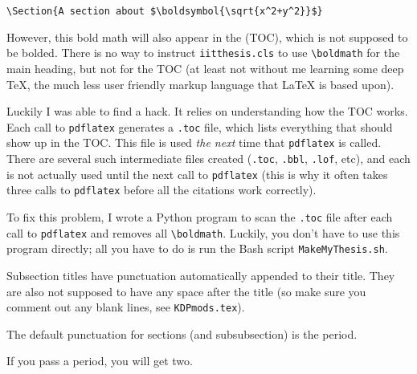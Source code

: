 \documentclass{iitthesis}
\begin{document}
	\verb|\Section{A section about $\boldsymbol{\sqrt{x^2+y^2}}$}|

\noindent 
However, this bold math will also appear in the (TOC), 
which is not supposed to be bolded.
There is no way to instruct {\tt iitthesis.cls} to use \verb|\boldmath|
for the main heading, but not for the TOC (at least not without me learning some deep TeX, 
the much less user friendly markup language that \LaTeX{} is based upon).

Luckily I was able to find a hack. It relies on understanding how the TOC works.
Each call to {\tt pdflatex} generates a {\tt .toc} file, 
which lists everything that should show up in the TOC. 
This file is used \emph{the next} time that {\tt pdflatex} is called. 
There are several such intermediate files created ({\tt .toc}, {\tt .bbl}, {\tt .lof}, etc),
and each is not actually used until the next call to {\tt pdflatex}
(this is why it often takes three calls to {\tt pdflatex} before all 
the citations work correctly).

To fix this problem, I wrote a Python program to scan the {\tt .toc} file 
after each call to {\tt pdflatex} and removes all \verb|\boldmath|.
Luckily, you don't have to use this program directly; 
all you have to do is run the Bash script {\tt MakeMyThesis.sh}.



Subsection titles have punctuation automatically appended to their title. 
They are also not supposed to have any space after the title
(so make sure you comment out any blank lines, see {\tt KDPmods.tex}).


% 
The default punctuation for sections (and subsubsection) is the period.


% 
If you pass a period, you will get two.

\begin{verb}
\end{verb}
\end{document}
